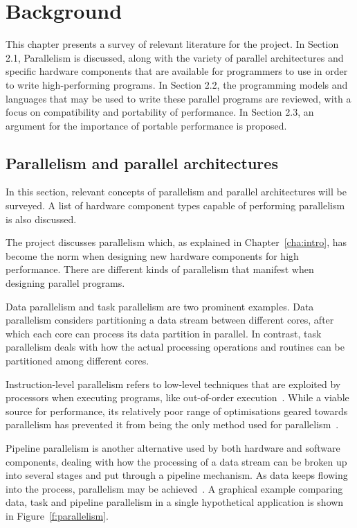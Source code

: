 \chapter{Background}
\label{cha:back}

This chapter presents a survey of relevant literature for the project. In Section 2.1, Parallelism is discussed, along with the variety of parallel architectures and specific hardware components that are available for programmers to use in order to write high-performing programs. In Section 2.2, the programming models and languages that may be used to write these parallel programs are reviewed, with a focus on compatibility and portability of performance. In Section 2.3, an argument for the importance of portable performance is proposed.

\section{Parallelism and parallel architectures}

In this section, relevant concepts of parallelism and parallel architectures will be surveyed. A list of hardware component types capable of performing parallelism is also discussed.

The project discusses parallelism which, as explained in Chapter~\ref{cha:intro}, has become the norm when designing new hardware components for high performance. There are different kinds of parallelism that manifest when designing parallel programs. 

Data parallelism and task parallelism are two prominent examples\cite{subhlok1993exploiting}. Data parallelism considers partitioning a data stream between different cores, after which each core can process its data partition in parallel. In contrast, task parallelism deals with how the actual processing operations and routines can be partitioned among different cores.

Instruction-level parallelism refers to low-level techniques that are exploited by processors when executing programs, like out-of-order execution~\cite{hennessy2012computer}. While a viable source for performance, its relatively poor range of optimisations geared towards parallelism has prevented it from being the only method used for parallelism~\cite{goossens2013limits}.

Pipeline parallelism is another alternative used by both hardware and software components, dealing with how the processing of a data stream can be broken up into several stages and put through a pipeline mechanism. As data keeps flowing into the process, parallelism may be achieved~\cite{gordon2006exploiting}. A graphical example comparing data, task and pipeline parallelism in a single hypothetical application is shown in Figure~\ref{f:parallelism}.

